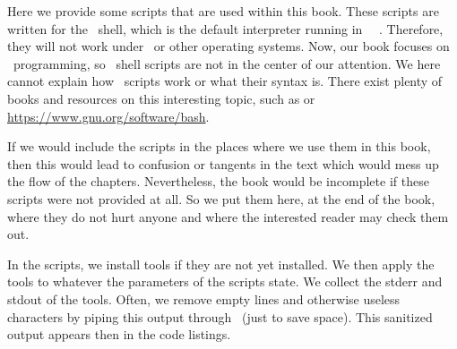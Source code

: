 %
%
%
%
%
%
%
%
%
%
%
%
%
%
%
%
%
Here we provide some scripts that are used within this book.
These scripts are written for the \bash\ shell, which is the default interpreter running in \ubuntu\ \linux\ .
Therefore, they will not work under \microsoftWindows\ or other operating systems.
Now, our book focuses on \python\ programming, so \bash\ shell scripts are not in the center of our attention.
We here cannot explain how \bash\ scripts work or what their syntax is.
There exist plenty of books and resources on this interesting topic, such as or \url{https://www.gnu.org/software/bash}.

If we would include the scripts in the places where we use them in this book, then this would lead to confusion or tangents in the text which would mess up the flow of the chapters.
Nevertheless, the book would be incomplete if these scripts were not provided at all.
So we put them here, at the end of the book, where they do not hurt anyone and where the interested reader may check them out.

In the scripts, we install tools if they are not yet installed.
We then apply the tools to whatever the parameters of the scripts state.
We collect the \gls{stderr} and \gls{stdout} of the tools.
Often, we remove empty lines and otherwise useless characters by piping this output through ~(just to save space).
This sanitized output appears then in the code listings.

